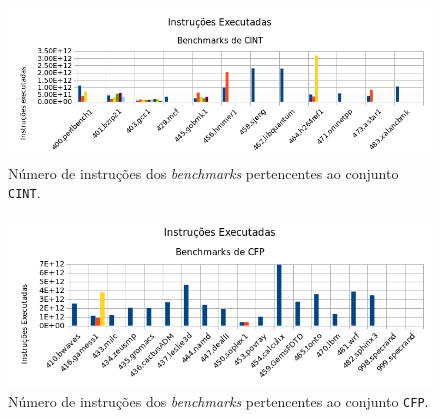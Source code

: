 \documentclass[12pt]{article}
\begin{document}

\begin{figure}[h!]
\centering
  \centering
  \label{fig:cint}
  \includegraphics[width=0.9\linewidth]{cint}
  \caption{Número de instruções dos \textit{benchmarks} pertencentes ao conjunto \texttt{CINT}.}
\end{figure}

\vspace{-12pt}

\begin{figure}[h!]
  \centering
  \label{fig:cfp} 
  \includegraphics[width=0.9\linewidth]{cfp}
  \caption{Número de instruções dos \textit{benchmarks} pertencentes ao conjunto \texttt{CFP}.}
\end{figure}
\end{document}
